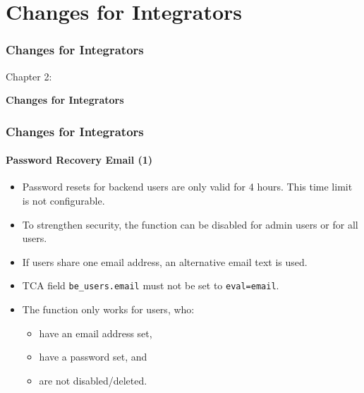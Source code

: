 %

\section{Changes for Integrators}
\begin{frame}[fragile]
	\frametitle{Changes for Integrators}

	\begin{center}\huge{Chapter 2:}\end{center}
	\begin{center}\huge{\color{typo3darkgrey}\textbf{Changes for Integrators}}\end{center}

\end{frame}


\begin{frame}[fragile]
	\frametitle{Changes for Integrators}
	\framesubtitle{Password Recovery Email (1)}

	\begin{itemize}

		\item Password resets for backend users are only valid for 4 hours.\newline
			This time limit is not configurable.
		\item To strengthen security, the function can be disabled for admin users or for all users.
		\item If users share one email address, an alternative email text is used.
		\item TCA field \texttt{be\_users.email} must not be set to \texttt{eval=email}.

		\item The function only works for users, who:
			\begin{itemize}
				\item have an email address set,
				\item have a password set, and
				\item are not disabled/deleted.
			\end{itemize}

	\end{itemize}

\end{frame}

